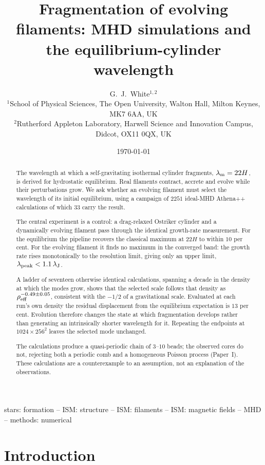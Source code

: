 \documentclass[usenatbib,twoside,twocolumn]{mnras}
\title[Fragmentation of evolving filaments]{Fragmentation of evolving filaments: MHD simulations and the equilibrium-cylinder wavelength}
\author[G.~J.~White]{G.~J.~White$^{1,2}$\\
$^{1}$School of Physical Sciences, The Open University, Walton Hall, Milton Keynes, MK7 6AA, UK\\
$^{2}$Rutherford Appleton Laboratory, Harwell Science and Innovation Campus, Didcot, OX11 0QX, UK}
\date{\today}
\begin{document}
\label{firstpage}
\maketitle

\begin{abstract}

The wavelength at which a self-gravitating isothermal cylinder fragments, $\lambda_{\rm m}=22H$, is derived for hydrostatic equilibrium. Real filaments contract, accrete and evolve while their perturbations grow. We ask whether an evolving filament must select the wavelength of its initial equilibrium, using a campaign of $2251$ ideal-MHD Athena++ calculations of which $33$ carry the result.

The central experiment is a control: a drag-relaxed Ostriker cylinder and a dynamically evolving filament pass through the identical growth-rate measurement. For the equilibrium the pipeline recovers the classical maximum at $22H$ to within $10$ per cent. For the evolving filament it finds no maximum in the converged band: the growth rate rises monotonically to the resolution limit, giving only an upper limit, $\lambda_{\rm peak}<1.1\,\lambda_{\rm J}$.

A ladder of seventeen otherwise identical calculations, spanning a decade in the density at which the modes grow, shows that the selected scale follows that density as $\rho_{\rm eff}^{-0.49\pm0.05}$, consistent with the $-1/2$ of a gravitational scale. Evaluated at each run's own density the residual displacement from the equilibrium expectation is $13$ per cent. Evolution therefore changes the state at which fragmentation develops rather than generating an intrinsically shorter wavelength for it. Repeating the endpoints at $1024\times256^2$ leaves the selected mode unchanged.

The calculations produce a quasi-periodic chain of $3$--$10$ beads; the observed cores do not, rejecting both a periodic comb and a homogeneous Poisson process (Paper~I). These calculations are a counterexample to an assumption, not an explanation of the observations.

\end{abstract}

\begin{keywords}
stars: formation -- ISM: structure -- ISM: filaments -- ISM: magnetic fields -- MHD -- methods: numerical
\end{keywords}

\section{Introduction}
\label{sec:intro}
\end{document}
